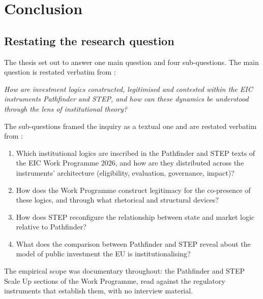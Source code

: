 %
\chapter{Conclusion}
\label{ch:conclusion}

\section{Restating the research question}
\label{sec:conc-rq}

The thesis set out to answer one main question and four sub-questions.
The main question is restated verbatim from :

\medskip
\noindent\textit{How are investment logics constructed, legitimised and
contested within the EIC instruments Pathfinder and STEP, and how can
these dynamics be understood through the lens of institutional theory?}
\medskip

The sub-questions framed the inquiry as a textual one and are restated
verbatim from :

\begin{enumerate}[label=\textbf{SQ\arabic*.},leftmargin=*]
    \item Which institutional logics are inscribed in the Pathfinder and
          STEP texts of the EIC Work Programme 2026, and how are they
          distributed across the instruments' architecture
          (eligibility, evaluation, governance, impact)?
    \item How does the Work Programme construct legitimacy for the
          co-presence of these logics, and through what rhetorical and
          structural devices?
    \item How does STEP reconfigure the relationship between state and
          market logic relative to Pathfinder?
    \item What does the comparison between Pathfinder and STEP reveal
          about the model of public investment the EU is
          institutionalising?
\end{enumerate}

The empirical scope was documentary throughout: the Pathfinder and STEP
Scale Up sections of the Work Programme, read against the regulatory
instruments that establish them, with no interview material.


